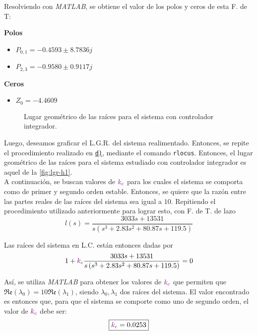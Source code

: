 Resolviendo con \textit{MATLAB}, se obtiene el valor de los polos y ceros de esta F. de T:

\begin{multicols}{2}
    \textbf{Polos}
    \begin{itemize}
        \item \(P_{0,1} = -0.4593 \pm 8.7836j\)
        \item \(P_{2,3} = -0.9580 \pm 0.9117j\)
    \end{itemize}

    \columnbreak

    \textbf{Ceros}
    \begin{itemize}
        \item \(Z_0 = -4.4609\)
    \end{itemize}
\end{multicols}

\begin{figure}[ht]
    \centering
    
    \caption{Lugar geométrico de las raíces para el sistema con controlador integrador.}
    \label{fig:lgr-h1}
\end{figure}

Luego, deseamos graficar el L.G.R. del sistema realimentado. Entonces, se repite
el procedimiento realizado en \hyperref[pregunta-d]{\texttt{d)}}, mediante el
comando \verb|rlocus|. Entonces, el lugar geométrico de las raíces para el sistema
estudiado con controlador integrador es aquel de la \autoref{fig:lgr-h1}. \\

A continuación, se buscan valores de $\mathbin{\color{violet}k_{c}}$ para los cuales el sistema se
comporta como de primer y segundo orden estable. Entonces, se quiere que la razón
entre las partes reales de las raíces del sistema sea igual a $10$. Repitiendo
el procedimiento utilizado anteriormente para lograr esto, con F. de T. de lazo
\begin{equation}
    l(s) = \frac{3033s + 13531}{s\left(s^{3} + 2.83s^{2} + 80.87s + 119.5\right)}
\end{equation}

Las raíces del sistema en L.C. están entonces dadas por
\begin{equation}
    1 + \mathbin{\color{violet}k_{c}}\frac{3033s + 13531}{s\left(s^{3} + 2.83s^{2} + 80.87s + 119.5\right)} = 0
\end{equation}

Así, se utiliza \textit{MATLAB} para obtener los valores de $\mathbin{\color{violet}k_{c}}$ que
permiten que $\mathfrak{Re}(\lambda_{0}) = 10\mathfrak{Re}(\lambda_{1})$, siendo
$\lambda_{0}, \lambda_{1}$ dos raíces del sistema. El valor encontrado es entonces
que, para que el sistema se comporte como uno de segundo orden, el valor de
$\mathbin{\color{violet}k_{c}}$ debe ser:
\begin{equation}
    \boxed{\mathbin{\color{violet}k_{c}} = 0.0253}
\end{equation}

